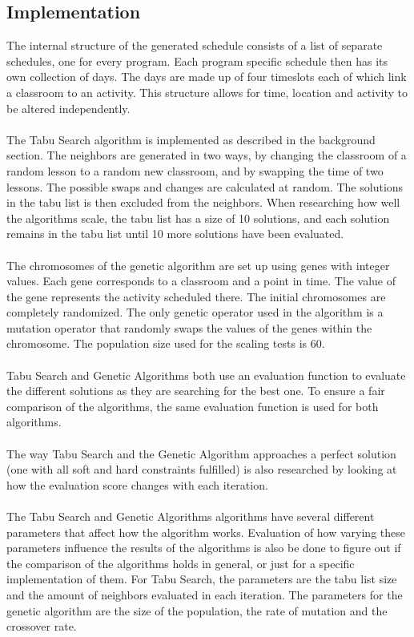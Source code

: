 \documentclass[titlepage,a4paper]{article}
\begin{document}
\subsection{Implementation}
The internal structure of the generated schedule consists of a list of separate schedules, one for every program. Each program specific schedule then has its own collection of days. The days are made up of four timeslots each of which link a classroom to an activity. This structure allows for time, location and activity to be altered independently. \\\\
The Tabu Search algorithm is implemented as described in the background section. The neighbors are generated in two ways, by changing the classroom of a random lesson to a random new classroom, and by swapping the time of two lessons. The possible swaps and changes are calculated at random. The solutions in the tabu list is then excluded from the neighbors. When researching how well the algorithms scale, the tabu list has a size of 10 solutions, and each solution remains in the tabu list until 10 more solutions have been evaluated. \\\\
The chromosomes of the genetic algorithm are set up using genes with integer values. Each gene corresponds to a classroom and a point in time. The value of the gene represents the activity scheduled there. The initial chromosomes are completely randomized. The only genetic operator used in the algorithm is a mutation operator that randomly swaps the values of the genes within the chromosome. The population size used for the scaling tests is 60. \\\\
Tabu Search and Genetic Algorithms both use an evaluation function to evaluate the different solutions as they are searching for the best one. To ensure a fair comparison of the algorithms, the same evaluation function is used for both algorithms. \\\\
The way Tabu Search and the Genetic Algorithm approaches a perfect solution (one with all soft and hard constraints fulfilled) is also researched by looking at how the evaluation score changes with each iteration. \\\\
The Tabu Search and Genetic Algorithms algorithms have several different parameters that affect how the algorithm works. Evaluation of how varying these parameters influence the results of the algorithms is also be done to figure out if the comparison of the algorithms holds in general, or just for a specific implementation of them.
For Tabu Search, the parameters are the tabu list size and the amount of neighbors evaluated in each iteration. 
The parameters for the genetic algorithm are the size of the population, the rate of mutation and the crossover rate.
\end{document}
